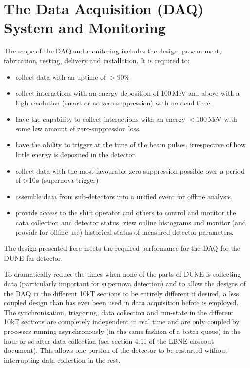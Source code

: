 \section{The Data Acquisition (DAQ) System and Monitoring} 
\label{sec:detectors-fd-ref-daq}

The scope of the DAQ and monitoring includes the design, procurement,
fabrication, testing, delivery and installation. It is required to:
\begin{itemize}
\item collect data with an uptime of $>90$\%
\item collect interactions with an energy deposition of
  100\,MeV and above with a high resolution (smart or no
  zero-suppression) with no dead-time.
\item have the capability to collect interactions with an energy $<100$\,MeV with some
 low amount of zero-suppression loss.
\item have the ability to trigger at the time of the beam pulses,
  irrespective of how little energy is deposited in the detector.
\item collect data with the most favourable zero-suppression possible over a
  period of >10\,s (supernova trigger)
\item assemble data from sub-detectors into a unified
  event for offline analysis.
\item provide access to the shift operator and others to control and
  monitor the data collection and detector status, view online
  histograms and monitor (and provide for offline use) historical
  status of measured detector parameters. 
\end{itemize}
The design presented here meets the required performance for the DAQ
for the DUNE far detector.

To dramatically reduce the times when none of the parts of DUNE is
collecting data (particularly important for supernova detection) and
to allow the designs of the DAQ in the different 10kT sections to be
entirely different if desired, a less coupled design than has ever
been used in data acquisition before is employed.  The
synchronisation, triggering, data collection and run-state in the
different 10kT sections are completely independent in real time and
are only coupled by processes running asynchronously (in the same fashion
of a batch queue) in the hour or so after data collection (see section
4.11 of the LBNE-closeout document).  This allows one portion of the
detector to be restarted without interrupting data collection in the
rest.

